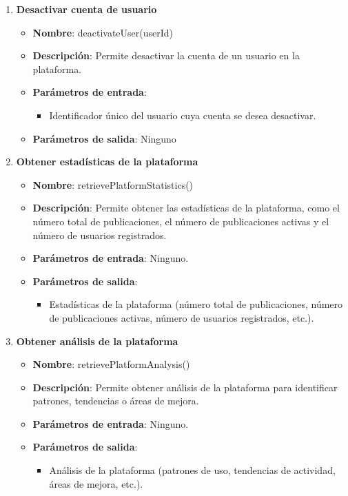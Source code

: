 \begin{enumerate}[label=SOP-\protect\twodigits{\arabic*}:, align=left, leftmargin=*]
\item \textbf{Desactivar cuenta de usuario}
\begin{itemize}
\item \textbf{Nombre}: deactivateUser(userId)
\item \textbf{Descripción}: Permite desactivar la cuenta de un usuario en la plataforma.
\item \textbf{Parámetros de entrada}:
\begin{itemize}
\item Identificador único del usuario cuya cuenta se desea desactivar.
\end{itemize}
\item \textbf{Parámetros de salida}: Ninguno
\end{itemize}

\item \textbf{Obtener estadísticas de la plataforma}
\begin{itemize}
\item \textbf{Nombre}: retrievePlatformStatistics()
\item \textbf{Descripción}: Permite obtener las estadísticas de la plataforma, como el número total de publicaciones, el número de publicaciones activas y el número de usuarios registrados.
\item \textbf{Parámetros de entrada}: Ninguno.
\item \textbf{Parámetros de salida}:
\begin{itemize}
\item Estadísticas de la plataforma (número total de publicaciones, número de publicaciones activas, número de usuarios registrados, etc.).
\end{itemize}
\end{itemize}

\item \textbf{Obtener análisis de la plataforma}
\begin{itemize}
\item \textbf{Nombre}: retrievePlatformAnalysis()
\item \textbf{Descripción}: Permite obtener análisis de la plataforma para identificar patrones, tendencias o áreas de mejora.
\item \textbf{Parámetros de entrada}: Ninguno.
\item \textbf{Parámetros de salida}:
\begin{itemize}
\item Análisis de la plataforma (patrones de uso, tendencias de actividad, áreas de mejora, etc.).
\end{itemize}
\end{itemize}


\end{enumerate}
